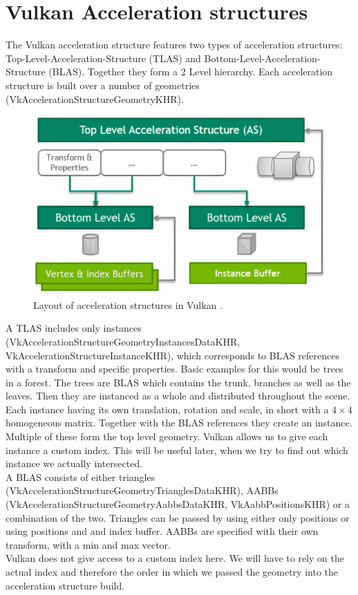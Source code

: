 \section{Vulkan Acceleration structures}
\label{sec:VkAccelrationStructure}
The Vulkan acceleration structure features two types of acceleration structures: Top-Level-Acceleration-Structure (TLAS) and Bottom-Level-Acceleration-Structure (BLAS). Together they form a 2 Level hierarchy. Each acceleration structure is built over a number of geometries (VkAccelerationStructureGeometryKHR).

\begin{figure}
    \centering
    \includegraphics[width=.8\textwidth]{images/showcase/accelerationStrucutres.jpg}
    \caption{Layout of acceleration structures in Vulkan \cite{vulkanRayTracing}.}
    \label{fig:VkASLayout}
\end{figure}
 
A TLAS includes only instances (VkAccelerationStructureGeometryInstancesDataKHR, VkAccelerationStructureInstanceKHR), which corresponds to BLAS references with a transform and specific properties. Basic examples for this would be trees in a forest. The trees are BLAS which contains the trunk, branches as well as the leaves. Then they are instanced as a whole and distributed throughout the scene. Each instance having its own translation, rotation and scale, in short with a $4\times4$ homogeneous matrix. Together with the BLAS references they create an instance. Multiple of these form the top level geometry. Vulkan allows us to give each instance a custom index. This will be useful later, when we try to find out which instance we actually intersected.\\
A BLAS consists of either triangles (VkAccelerationStructureGeometryTrianglesDataKHR), AABBs (VkAccelerationStructureGeometryAabbsDataKHR, VkAabbPositionsKHR) or a combination of the two. Triangles can be passed by using either only positions or using positions and and index buffer. AABBs are specified with their own transform, with a min and max vector.\\
Vulkan does not give access to a custom index here. We will have to rely on the actual index and therefore the order in which we passed the geometry into the acceleration structure build.
\cite{vulkanRayTracing}
\newpage
